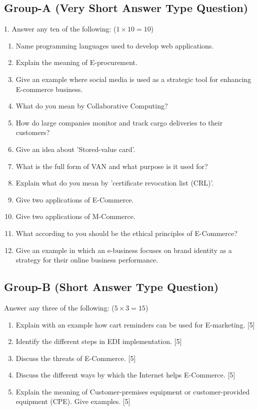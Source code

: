 \documentclass{article}
\begin{document}
\subsection*{Group-A (Very Short Answer Type Question)}
1. Answer any ten of the following: ($1 \times 10 = 10$)
\begin{enumerate}
    \item[(I)] Name programming languages used to develop web applications.
    \item[(II)] Explain the meaning of E-procurement.
    \item[(III)] Give an example where social media is used as a strategic tool for enhancing E-commerce business.
    \item[(IV)] What do you mean by Collaborative Computing?
    \item[(V)] How do large companies monitor and track cargo deliveries to their customers?
    \item[(VI)] Give an idea about 'Stored-value card'.
    \item[(VII)] What is the full form of VAN and what purpose is it used for?
    \item[(VIII)] Explain what do you mean by 'certificate revocation list (CRL)'.
    \item[(IX)] Give two applications of E-Commerce.
    \item[(X)] Give two applications of M-Commerce.
    \item[(XI)] What according to you should be the ethical principles of E-Commerce?
    \item[(XII)] Give an example in which an e-business focuses on brand identity as a strategy for their online business performance.
\end{enumerate}

\subsection*{Group-B (Short Answer Type Question)}
Answer any three of the following: ($5 \times 3 = 15$)
\begin{enumerate}
    \item[2.] Explain with an example how cart reminders can be used for E-marketing. [5]
    \item[3.] Identify the different steps in EDI implementation. [5]
    \item[4.] Discuss the threats of E-Commerce. [5]
    \item[5.] Discuss the different ways by which the Internet helps E-Commerce. [5]
    \item[6.] Explain the meaning of Customer-premises equipment or customer-provided equipment (CPE). Give examples. [5]
\end{enumerate}
\end{document}
